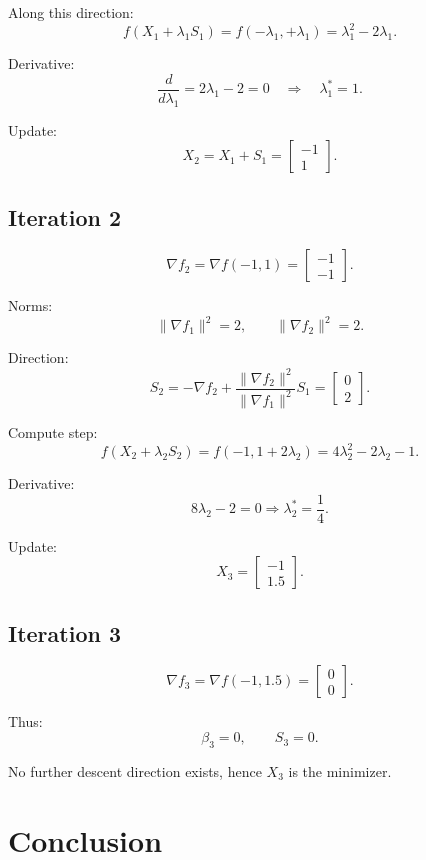 \documentclass[9pt,a4paper]{extarticle}
\begin{document}
Along this direction:
\[
f(X_1 + \lambda_1 S_1)
= f(-\lambda_1, +\lambda_1) = \lambda_1^2 - 2\lambda_1.
\]

Derivative:
\[
\frac{d}{d\lambda_1} = 2\lambda_1 - 2 = 0
\quad\Rightarrow\quad
\lambda_1^* = 1.
\]

Update:
\[
X_2 = X_1 + S_1 =
\begin{bmatrix}
-1\\
1
\end{bmatrix}.
\]

\subsection*{Iteration 2}

\[
\nabla f_2 = \nabla f(-1,1) =
\begin{bmatrix}
-1\\
-1
\end{bmatrix}.
\]

Norms:
\[
\|\nabla f_1\|^2 = 2,
\qquad
\|\nabla f_2\|^2 = 2.
\]

Direction:
\[
S_2 = -\nabla f_2 + \frac{\|\nabla f_2\|^2}{\|\nabla f_1\|^2} S_1
=
\begin{bmatrix}
0\\
2
\end{bmatrix}.
\]

Compute step:
\[
f(X_2 + \lambda_2 S_2)
= f(-1,1 + 2\lambda_2)
= 4\lambda_2^2 - 2\lambda_2 - 1.
\]

Derivative:
\[
8\lambda_2 - 2 = 0
\Rightarrow
\lambda_2^* = \frac14.
\]

Update:
\[
X_3 =
\begin{bmatrix}
-1\\[4pt]
1.5
\end{bmatrix}.
\]

\subsection*{Iteration 3}

\[
\nabla f_3 = \nabla f(-1,1.5)=
\begin{bmatrix}
0\\
0
\end{bmatrix}.
\]

Thus:
\[
\beta_3 = 0, 
\qquad
S_3 = 0.
\]

No further descent direction exists, hence $X_3$ is the minimizer.

\section{Conclusion}
\end{document}
